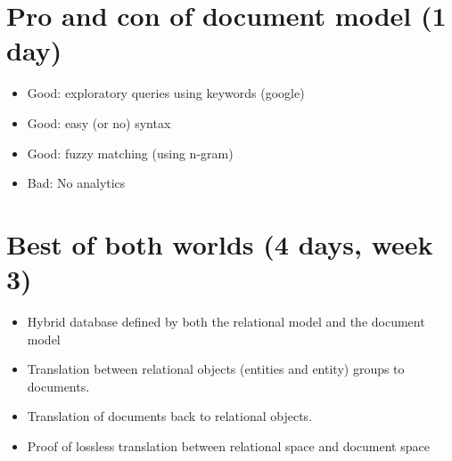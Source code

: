 \section{Pro and con of document model (1 day)}
	\begin{itemize}
		\item Good: exploratory queries using keywords (google)
		\item Good: easy (or no) syntax
		\item Good: fuzzy matching (using n-gram)
		\item Bad: No analytics
	\end{itemize}
		
		\section{Best of both worlds (4 days, week 3)}
	\begin{itemize}
		\item Hybrid database defined by both the relational model and the document model
		\item Translation between relational objects (entities and entity) groups to documents.
		\item Translation of documents back to relational objects.
		\item Proof of lossless translation between relational space and document space
	\end{itemize}